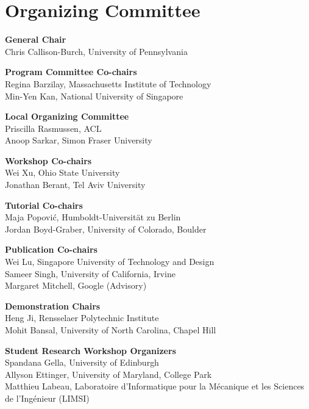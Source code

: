 \markboth{}{} %
\markright{}{} %

\section{Organizing Committee}{}

\setlength{\parindent}{0pt}

{\bf General Chair} \\
Chris Callison-Burch, University of Pennsylvania

{\bf Program Committee Co-chairs} \\
Regina Barzilay, Massachusetts Institute of Technology\\
Min-Yen Kan, National University of Singapore

{\bf Local Organizing Committee} \\
Priscilla Rasmussen, ACL\\
Anoop Sarkar, Simon Fraser University

{\bf Workshop Co-chairs} \\
Wei Xu, Ohio State University \\
Jonathan Berant, Tel Aviv University

{\bf Tutorial Co-chairs} \\
Maja Popovi\'{c}, Humboldt-Universität zu Berlin \\
Jordan Boyd-Graber, University of Colorado, Boulder

{\bf Publication Co-chairs} \\
Wei Lu, Singapore University of Technology and Design \\
Sameer Singh, University of California, Irvine \\
Margaret Mitchell, Google (Advisory)

{\bf Demonstration Chairs} \\
Heng Ji, Rensselaer Polytechnic Institute \\
Mohit Bansal, University of North Carolina, Chapel Hill

{\bf Student Research Workshop Organizers} \\
\hspace*{0.2in} Spandana Gella, University of Edinburgh \\
\hspace*{0.2in} Allyson Ettinger, University of Maryland, College Park \\
\hspace*{0.2in} Matthieu Labeau, Laboratoire d’Informatique pour la Mécanique et les Sciences de l’Ingénieur (LIMSI) \\

